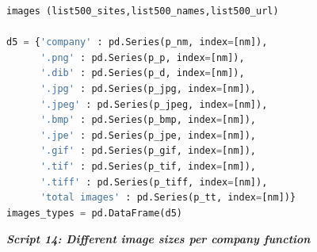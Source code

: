 \documentclass{article}
\begin{document}
\begin{lstlisting}[language=Python]
images (list500_sites,list500_names,list500_url)

d5 = {'company' : pd.Series(p_nm, index=[nm]),
      '.png' : pd.Series(p_p, index=[nm]),
      '.dib' : pd.Series(p_d, index=[nm]),
      '.jpg' : pd.Series(p_jpg, index=[nm]),
      '.jpeg' : pd.Series(p_jpeg, index=[nm]),
      '.bmp' : pd.Series(p_bmp, index=[nm]),
      '.jpe' : pd.Series(p_jpe, index=[nm]),
      '.gif' : pd.Series(p_gif, index=[nm]),
      '.tif' : pd.Series(p_tif, index=[nm]),
      '.tiff' : pd.Series(p_tiff, index=[nm]), 
      'total images' : pd.Series(p_tt, index=[nm])}
images_types = pd.DataFrame(d5)    
\end{lstlisting}

\begin{center}
\textit{\textbf{Script 14: Different image sizes per company function}}\label{p14}
\end{center}
\end{document}
